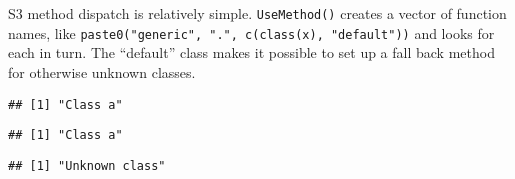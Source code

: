 S3 method dispatch is relatively simple. \texttt{UseMethod()} creates a
vector of function names, like
\texttt{paste0("generic",\ ".",\ c(class(x),\ "default"))} and looks for
each in turn. The ``default'' class makes it possible to set up a fall
back method for otherwise unknown classes.

\begin{Shaded}
\begin{Highlighting}[]
\StringTok{ }\NormalTok{(}\NormalTok{)}
\StringTok{ }
\StringTok{ }

\NormalTok{(}\NormalTok{(}\NormalTok{(), } \NormalTok{))}
\end{Highlighting}
\end{Shaded}

\begin{verbatim}
## [1] "Class a"
\end{verbatim}

\begin{Shaded}
\begin{Highlighting}[]
\NormalTok{(}\NormalTok{(}\NormalTok{(), } \NormalTok{(}\NormalTok{, }\NormalTok{)))}
\end{Highlighting}
\end{Shaded}

\begin{verbatim}
## [1] "Class a"
\end{verbatim}

\begin{Shaded}
\begin{Highlighting}[]
\NormalTok{(}\NormalTok{(}\NormalTok{(), } \NormalTok{))}
\end{Highlighting}
\end{Shaded}

\begin{verbatim}
## [1] "Unknown class"
\end{verbatim}

